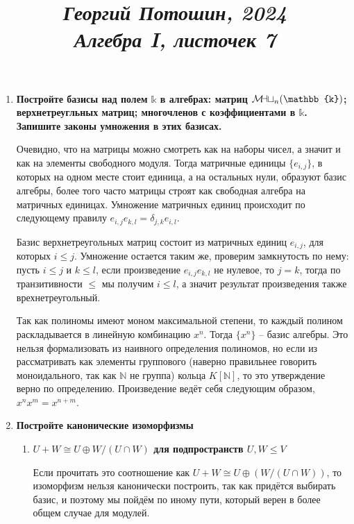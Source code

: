 \documentclass{article}
\title{
\textit{\small{Георгий Потошин, 2024}}\\
\vspace{0.3ex}
\textit{\huge{Алгебра I, листочек 7}}\vspace{1ex}
}
\date{\vspace{-10ex}}
\newcommand{\mymat}{\mathcal{M\mkern-3mu a\mkern-0.3mu t}}
\begin{document}
\maketitle

\begin{enumerate}
    \item \textbf{Постройте базисы над полем $\mathbb{k}$ в алгебрах: матриц $\mymat_n(\mathbb{k})$;
        верхнетреугльных матриц; многочленов с коэффициентами в $\mathbb{k}$. Запишите законы умножения
        в этих базисах.}

        Очевидно, что на матрицы можно смотреть как на наборы чисел, а значит и как на элементы свободного модуля.
        Тогда матричные единицы $\{e_{i,j}\}$, в которых на одном месте стоит единица, а  на остальных нули,
        образуют базис алгебры, более того часто матрицы строят как свободная алгебра на матричных единицах. Умножение
        матричных единиц происходит по следующему правилу $e_{i,j}e_{k,l}=\delta_{j,k}e_{i,l}$.

        Базис верхнетреугольных матриц состоит из матричных единиц $e_{i,j}$, для которых $i\leq j$. Умножение остается
        таким же, проверим замкнутость по нему: пусть $i\leq j$ и $k\leq l$, если произведение $e_{i,j}e_{k,l}$ не нулевое,
        то $j=k$, тогда по транзитивности $\leq$ мы получим $i\leq l$, а значит результат произведения также врехнетреугольный.

        Так как полиномы имеют моном максимальной степени, то каждый полином раскладывается в линейную комбинацию $x^n$.
        Тогда $\{x^n\}$ – базис алгебры. Это нельзя формализовать из наивного определения полиномов, но если из рассматривать
        как элементы группового (наверно правильнее говорить моноидального, так как $\mathbb{N}$ не группа) кольца
        $K[\mathbb{N}]$, то это утверждение верно по определению. Произведение ведёт себя следующим образом, $x^nx^m=x^{n+m}$.

    \item \textbf{Постройте канонические изоморфизмы}
        \begin{enumerate} 
            \item \textbf{$U+W\cong U\oplus W/(U\cap W)$ для подпространств $U,W\leq V$}

                Если прочитать это соотношение как $U+W\cong U\oplus (W/(U\cap W))$, то изоморфизм нельзя канонически
                построить, так как придётся выбирать базис, и поэтому мы пойдём по иному пути, который верен в более общем
                случае для модулей.


\end{enumerate}
\end{enumerate}
\end{document}
